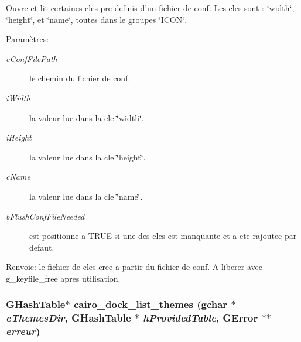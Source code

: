 Ouvre et lit certaines cles pre-definis d'un fichier de conf. Les cles sont : \char`\"{}width\char`\"{}, \char`\"{}height\char`\"{}, et \char`\"{}name\char`\"{}, toutes dans le groupes \char`\"{}ICON\char`\"{}. \begin{Desc}
\item[Param\`{e}tres:]
\begin{description}
\item[{\em c\-Conf\-File\-Path}]le chemin du fichier de conf. \item[{\em i\-Width}]la valeur lue dans la cle \char`\"{}width\char`\"{}. \item[{\em i\-Height}]la valeur lue dans la cle \char`\"{}height\char`\"{}. \item[{\em c\-Name}]la valeur lue dans la cle \char`\"{}name\char`\"{}. \item[{\em b\-Flush\-Conf\-File\-Needed}]est positionne a TRUE si une des cles est manquante et a ete rajoutee par defaut. \end{description}
\end{Desc}
\begin{Desc}
\item[Renvoie:]le fichier de cles cree a partir du fichier de conf. A liberer avec g\_\-keyfile\_\-free apres utilisation. \end{Desc}
\subsubsection{\setlength{\rightskip}{0pt plus 5cm}GHash\-Table$\ast$ cairo\_\-dock\_\-list\_\-themes (gchar $\ast$ {\em c\-Themes\-Dir}, GHash\-Table $\ast$ {\em h\-Provided\-Table}, GError $\ast$$\ast$ {\em erreur})}\label{cairo-dock-applet-factory_8c_f2b87f4aad180d5e5368088bdb05240b}


